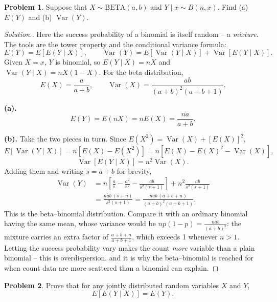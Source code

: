 \documentclass[12pt,a4paper]{report}
\theoremstyle{definition}
\theoremstyle{plain}
\theoremstyle{definition}
\newtheorem{problemx}{Problem}[section]
\newenvironment{problem}{\begin{problemx}}{\end{problemx}}
\newenvironment{solution}
  {\renewcommand{\qedsymbol}{}\begin{proof}[\textit{Solution}.]}
  {\end{proof}}
\begin{document}
\begin{problem}
Suppose that $X\sim \text{BETA}(a,b)$ and $Y\mid x \sim B(n,x)$. Find (a) $E(Y)$ and
(b) $\operatorname{Var}(Y)$.
\end{problem}

\begin{solution}
Here the success probability of a binomial is itself random -- a \emph{mixture}. The tools
are the tower property and the conditional variance formula:
\[E(Y) = E[E(Y\mid X)], \qquad
\operatorname{Var}(Y) = E[\operatorname{Var}(Y\mid X)]
 + \operatorname{Var}[E(Y\mid X)].\]
Given $X=x$, $Y$ is binomial, so $E(Y\mid X) = nX$ and
$\operatorname{Var}(Y\mid X) = nX(1-X)$. For the beta distribution,
\[E(X) = \frac{a}{a+b}, \qquad
\operatorname{Var}(X) = \frac{ab}{(a+b)^{2}(a+b+1)}.\]

\textbf{(a).} \[E(Y) = E(nX) = nE(X) = \frac{na}{a+b}.\]

\textbf{(b).} Take the two pieces in turn. Since
$E(X^{2}) = \operatorname{Var}(X)+\left[E(X)\right]^{2}$,
\[E[\operatorname{Var}(Y\mid X)] = n\left[E(X)-E(X^{2})\right]
 = n\left[E(X)-E(X)^{2}-\operatorname{Var}(X)\right],\]
\[\operatorname{Var}[E(Y\mid X)] = n^{2}\operatorname{Var}(X).\]
Adding them and writing $s = a+b$ for brevity,
\begin{align*}
\operatorname{Var}(Y) &= n\left[\frac{a}{s}-\frac{a^{2}}{s^{2}}-\frac{ab}{s^{2}(s+1)}\right]
 + n^{2}\frac{ab}{s^{2}(s+1)}\\
&= \frac{nab\,(s+n)}{s^{2}(s+1)}
 = \frac{nab\,(a+b+n)}{(a+b)^{2}(a+b+1)}.
\end{align*}
This is the beta--binomial distribution. Compare it with an ordinary binomial having the
same mean, whose variance would be $np(1-p) = \frac{nab}{(a+b)^{2}}$: the mixture carries
an extra factor of $\frac{a+b+n}{a+b+1}$, which exceeds 1 whenever $n>1$. Letting the
success probability vary makes the count \emph{more} variable than a plain binomial --
this is overdispersion, and it is why the beta--binomial is reached for when count data
are more scattered than a binomial can explain.
\end{solution}

\begin{problem}
Prove that for any jointly distributed random variables $X$ and $Y$,
\[E[E(Y\mid X)] = E(Y).\]
\end{problem}
\end{document}
